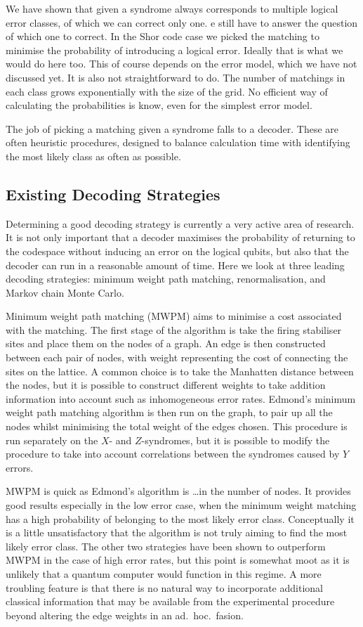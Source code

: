 We have shown that given a syndrome always corresponds to multiple logical error classes, of which we can correct only one.  e still have to answer the question of which one to correct. In the Shor code case we picked the matching to minimise the probability of introducing a logical error. Ideally that is what we would do here too. This of course depends on the error model, which we have not discussed yet. It is also not straightforward to do. The number of matchings in each class grows exponentially with the size of the grid. No efficient way of calculating the probabilities is know, even for the simplest error model.

The job of picking a matching given a syndrome falls to a decoder. These are often heuristic procedures, designed to balance calculation time with identifying the most likely class as often as possible. 

\subsection{Existing Decoding Strategies}

Determining a good decoding strategy is currently a very active area of research. It is not only important that a decoder maximises the probability of returning to the codespace without inducing an error on the logical qubits, but also that the decoder can run in a reasonable amount of time. Here we look at three leading decoding strategies: minimum weight path matching, renormalisation, and Markov chain Monte Carlo.

Minimum weight path matching (MWPM) aims to minimise a cost associated with the matching. The first stage of the algorithm is take the firing stabiliser sites and place them on the nodes of a graph. An edge is then constructed between each pair of nodes, with weight representing the cost of connecting the sites on the lattice. A common choice is to take the Manhatten distance between the nodes, but it is possible to construct different weights to take addition information into account such as inhomogeneous error rates. Edmond's minimum weight path matching algorithm is then run on the graph, to pair up all the nodes whilst minimising the total weight of the edges chosen. This procedure is run separately on the $X$- and $Z$-syndromes, but it is possible to modify the procedure to take into account correlations between the syndromes caused by $Y$ errors.

MWPM is quick as Edmond's algorithm is \ldots in the number of nodes. It provides good results especially in the low error case, when the minimum weight matching has a high probability of belonging to the most likely error class. Conceptually it is a little unsatisfactory that the algorithm is not truly aiming to find the most likely error class. The other two strategies have been shown to outperform MWPM in the case of high error rates, but this point is somewhat moot as it is unlikely that a quantum computer would function in this regime. A more troubling feature is that there is no natural way to incorporate additional classical information that may be available from the experimental procedure beyond altering the edge weights in an ad.\ hoc.\ fasion.

